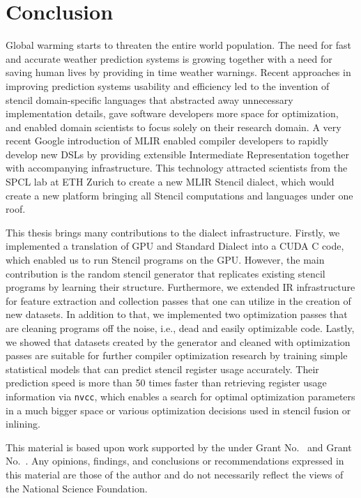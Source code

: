 \documentclass[sigplan,\review anonymous]{acmart}
\begin{document}
\section{Conclusion}

Global warming starts to threaten the entire world population. The
need for fast and accurate weather prediction systems is growing
together with a need for saving human lives by providing in time weather
warnings. Recent approaches in improving prediction systems usability
and efficiency led to the invention of stencil domain-specific languages
that abstracted away unnecessary implementation details, gave software
developers more space for optimization, and enabled domain scientists
to focus solely on their research domain. A very recent Google introduction
of MLIR enabled compiler developers to rapidly develop new DSLs by providing
extensible Intermediate Representation together with accompanying
infrastructure. This technology attracted scientists from the SPCL lab at
ETH Zurich to create a new MLIR Stencil dialect, which would create a new
platform bringing all Stencil computations and languages under one roof. 

This thesis brings many contributions to the dialect infrastructure. Firstly,
we implemented a translation of GPU and Standard Dialect into a CUDA C code,
which enabled us to run Stencil programs on the GPU. However, the main
contribution is the random stencil generator that replicates existing stencil
programs by learning their structure. Furthermore, we extended IR
infrastructure for feature extraction and collection passes that one can
utilize in the creation of new datasets. In addition to that, we implemented
two optimization passes that are cleaning programs off the noise, i.e., dead
and easily optimizable code. Lastly, we showed that datasets created by the
generator and cleaned with optimization passes are suitable for further
compiler optimization research by training simple statistical models that
can predict stencil register usage accurately. Their prediction speed is
more than 50 times faster than retrieving register usage information via
\texttt{nvcc}, which enables a search for optimal optimization parameters
in a much bigger space or various optimization decisions used in stencil
fusion or inlining.

\begin{acks}                            %
  This material is based upon work supported by the
   under Grant
  No.~ and Grant
  No.~.  Any opinions, findings, and
  conclusions or recommendations expressed in this material are those
  of the author and do not necessarily reflect the views of the
  National Science Foundation.
\end{acks}
\end{document}

